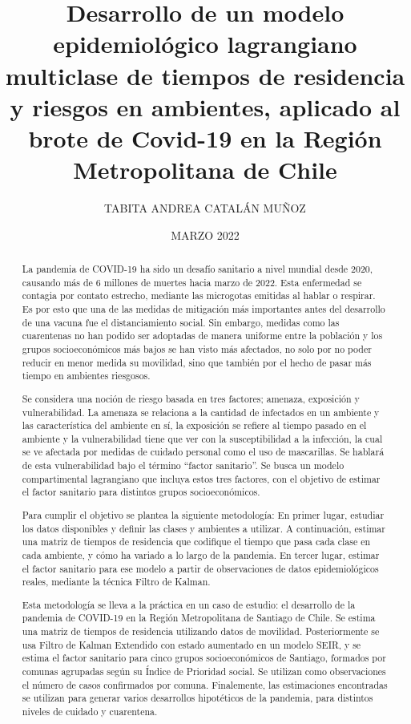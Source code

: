 \documentclass[upright, contnum]{umemoria}
\author{TABITA ANDREA CATALÁN MUÑOZ}
\title{Desarrollo de un modelo epidemiológico lagrangiano multiclase de tiempos de residencia y riesgos en ambientes, aplicado al brote de Covid-19 en la Región Metropolitana de Chile}
\date{MARZO 2022}
\begin{document}
\frontmatter
\maketitle

\begin{abstract}

La pandemia de COVID-19 ha sido un desafío sanitario a nivel mundial desde 2020, causando más de 6 millones de muertes hacia marzo de 2022. Esta enfermedad se contagia por contato estrecho, mediante las microgotas emitidas al hablar o respirar. Es por esto que una de las medidas de mitigación más importantes antes del desarrollo de una vacuna fue el distanciamiento social. Sin embargo, medidas como las cuarentenas no han podido ser adoptadas de manera uniforme entre la población y los grupos socioeconómicos más bajos se han visto más afectados, no solo por no poder reducir en menor medida su movilidad, sino que también por el hecho de pasar más tiempo en ambientes riesgosos.

Se considera una noción de riesgo basada en tres factores; amenaza, exposición y vulnerabilidad. La amenaza se relaciona a la cantidad de infectados en un ambiente y las característica del ambiente en sí, la exposición se refiere al tiempo pasado en el ambiente y la vulnerabilidad tiene que ver con la susceptibilidad a la infección, la cual se ve afectada por medidas de cuidado personal como el uso de mascarillas. Se hablará de esta vulnerabilidad bajo el término ``factor sanitario''. Se busca un modelo compartimental lagrangiano que incluya estos tres factores, con el objetivo de estimar el factor sanitario para distintos grupos socioeconómicos.

Para cumplir el objetivo se plantea la siguiente metodología: En primer lugar, estudiar los datos disponibles y definir las clases y ambientes a utilizar. A continuación, estimar una matriz de tiempos de residencia que codifique el tiempo que pasa cada clase en cada ambiente, y cómo ha variado a lo largo de la pandemia. En tercer lugar, estimar el factor sanitario para ese modelo a partir de observaciones de datos epidemiológicos reales, mediante la técnica Filtro de Kalman.

Esta metodología se lleva a la práctica en un caso de estudio: el desarrollo de la pandemia de COVID-19 en la Región Metropolitana de Santiago de Chile. Se estima una matriz de tiempos de residencia utilizando datos de movilidad. Posteriormente se usa Filtro de Kalman Extendido con estado aumentado en un modelo SEIR, y se estima el factor sanitario para cinco grupos socioeconómicos de Santiago, formados por comunas agrupadas según su Índice de Prioridad social. Se utilizan como observaciones el número de casos confirmados por comuna. Finalemente, las estimaciones encontradas se utilizan para generar varios desarrollos hipotéticos de la pandemia, para distintos niveles de cuidado y cuarentena.


\end{abstract}
\end{document}
